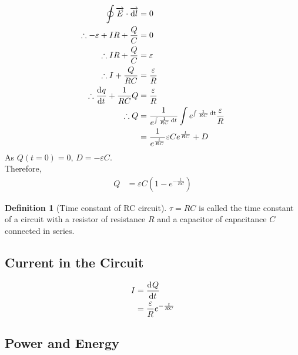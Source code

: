 \documentclass[fleqn, a4paper, 12pt, twoside]{article}
\theoremstyle{definition}
\newtheorem{definition}{Definition}
\theoremstyle{theorem}
\begin{document}
\begin{align*}
	\oint \overrightarrow{E} \cdot \overrightarrow{\dif l} & = 0                                                                                                \\
	\therefore -\varepsilon + I R + \frac{Q}{C}            & = 0                                                                                                \\
	\therefore I R + \frac{Q}{C}                           & = \varepsilon                                                                                      \\
	\therefore I + \frac{Q}{R C}                           & = \frac{\varepsilon}{R}                                                                            \\
	\therefore \dod{q}{t} + \frac{1}{R C} Q                & = \frac{\varepsilon}{R}                                                                            \\
	\therefore Q                                           & = \frac{1}{e^{\int \frac{1}{R C} \dif t}} \int e^{\int \frac{1}{R C} \dif t} \frac{\varepsilon}{R} \\
                                                               & = \frac{1}{e^{\frac{t}{R C}}} \varepsilon C e^{\frac{t}{R C}} + D
\end{align*}
As $Q(t = 0) = 0$, $D = -\varepsilon C$.\\
Therefore,
\begin{align*}
	Q & = \varepsilon C \left( 1 - e^{-\frac{t}{R C}} \right)
\end{align*}

\begin{definition}[Time constant of RC circuit]
	$\tau = R C$ is called the time constant of a circuit with a resistor of resistance $R$ and a capacitor of capacitance $C$ connected in series.
\end{definition}

\subsection{Current in the Circuit}

\begin{align*}
	I & = \dod{Q}{t} \\
          & = \frac{\varepsilon}{R} e^{-\frac{t}{R C}}
\end{align*}

\subsection{Power and Energy}
\end{document}
